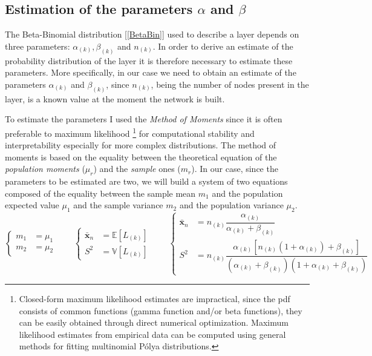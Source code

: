 \documentclass[10pt]{article} %
\begin{document}
\subsection{Estimation of the parameters $\alpha$ and $\beta$}
The Beta-Binomial distribution [\ref{BetaBin}] used to describe a layer depends on three parameters: $\alpha_{(k)}, \beta_{(k)}$ and $n_{(k)}$. In order to derive an estimate of the probability distribution of the layer it is therefore necessary to estimate these parameters. More specifically, in our case we need to obtain an estimate of the parameters $\alpha_{(k)}$ and $\beta_{(k)}$, since $n_{(k)}$, being the number of nodes present in the layer, is a known value at the moment the network is built.

To estimate the parameters I used the \textit{Method of Moments} since it is often preferable to maximum likelihood \footnote{Closed-form maximum likelihood estimates are impractical, since the pdf consists of common functions (gamma function and/or beta functions), they can be easily obtained through direct numerical optimization. Maximum likelihood estimates from empirical data can be computed using general methods for fitting multinomial Pólya distributions.} for computational stability and interpretability especially for more complex distributions. The method of moments is based on the equality between the theoretical equation of the \textit{population moments} ($\mu_{r}$) and the \textit{sample} ones ($m_{r}$). In our case, since the parameters to be estimated are two, we will build a system of two equations composed of the equality between the sample mean $m_{1}$ and the population expected value $\mu_{1}$ and the sample variance $m_{2}$ and the population variance $\mu_{2}$.
\begin{equation}
    \begin{cases}
        m_{1} &= \mu_{1}\\
        m_{2} &= \mu_{2}
    \end{cases} \qquad
    \begin{cases}
        \bar{\mathbf{x}}_{n} &= \mathbb{E}[L_{(k)}]\\
        S^{2} &= \mathbb{V}[L_{(k)}]
    \end{cases} \qquad
    \begin{cases}
        \bar{\mathbf{x}}_{n} &= n_{(k)}\dfrac{\alpha_{(k)}}{\alpha_{(k)}+\beta_{(k)}}\\
        S^{2} &= n_{(k)}\dfrac{\alpha_{(k)}[n_{(k)}(1+\alpha_{(k)})+\beta_{(k)}]}{(\alpha_{(k)}+\beta_{(k)})(1+\alpha_{(k)}+\beta_{(k)})}
    \end{cases}
\end{equation}
\end{document}
